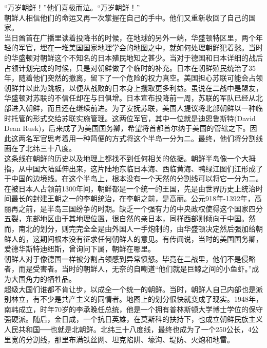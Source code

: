 “万岁朝鲜！”他们喜极而泣。“万岁朝鲜！”\\

朝鲜人相信他们的命运又再一次掌握在自己的手中。他们又重新收回了自己的国家。\\

当日酋首在广播里读着投降书的时候，在地球的另外一端，华盛顿特区里，两个年轻的军官，埋在一堆美国国家地理学会的地图之中，就如何处理朝鲜犯着愁。当时的华盛顿对朝鲜这个不知名的日本殖民地知之甚少。当对于德国和日本详细的战后占领计划完成的时候，只是对朝鲜做了个临时的补充。日本在朝鲜殖民统治了35年，随着他们突然的撤离，留下了一个危险的权力真空。美国担心苏联可能会占领朝鲜并以此为跳板，以便从战败的日本身上攫取更多利益。虽说在二战中是盟友，华盛顿对苏联的不信任却在与日俱增。日本宣布投降前一周，苏联的军队已经从北部进入朝鲜，而且还在继续前进。为了安抚苏联，美国人提议将北部朝鲜以一种临时托管的形式交给苏联实施管理。这两位军官，其中一位就是迪恩鲁斯特(David Dean Rusk)，后来成了为美国国务卿，希望将首都首尔纳于美国的管辖之下。因此这两名军官思考着用一种简便的方式将这个半岛一分为二。最终，他们将分割线画在了北纬三十八度。\\

这条线在朝鲜的历史以及地理上都找不到任何相关的依据。朝鲜半岛像一个大拇指，从中国大陆延伸出来，这片陆地东临日本海、西临黄海、鸭绿江图们江形成了于中国的边境线。在这个半岛上，根本没有一个天然的分割线可以将它一分为二。在被日本人占领前1300年间，朝鲜都是一个统一的王国，先是由世界历史上统治时间最长的封建王朝之一的李朝统治，在李朝之前，是高丽。公元918年-1392年，高丽再之前，是半岛三国纷争的时期。缺乏一个强有力的中央政权使得这个国家四分五裂，东部地区由于其地理位置，很自然的亲日本，同样西部则倾向于中国。然而，南北的划分，则完完全全是由外国人一手炮制的，由华盛顿决定然后强加给朝鲜人的，这期间根本没有征求任何朝鲜人的意见。有传闻说，当时的美国国务卿，爱德华斯特迪纽斯，曾询问下属，朝鲜在哪里。\\

朝鲜人对于像德国一样被分割占领感到异常愤怒。毕竟在二战里，他们不是侵略者，而是受害者。当时的朝鲜人，无奈的自嘲道“他们就是巨鲸之间的小鱼虾。”成为大国角力的牺牲品。\\

超级大国们谁都不肯让步，以成全一个统一的朝鲜。当时，朝鲜人自己内部也是派别林立，有不少是共产主义的同情者。地图上的划分很快就变成了现实。1948年，南韩成立，时年70岁的李承晚任总统，他是一个拥有普林斯顿大学博士学位的保守强硬派。随后，金日成，一个抗日英雄，在莫斯科的扶持下，也成立朝鲜民族主义人民共和国──也就是北朝鲜。北纬三十八度线，最终也成为了一个250公长，4公里宽的分割线，那里布满铁丝网、坦克陷阱、壕沟、堤防、火炮和地雷。\\

